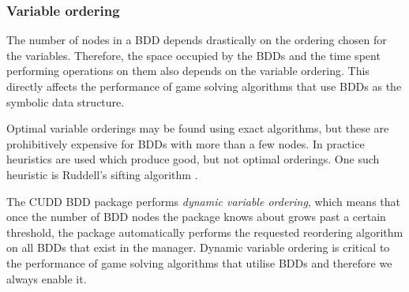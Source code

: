 \subsubsection{Variable ordering}

The number of nodes in a BDD depends drastically on the ordering chosen for the variables. Therefore, the space occupied by the BDDs and the time spent performing operations on them also depends on the variable ordering. This directly affects the performance of game solving algorithms that use BDDs as the symbolic data structure. 

Optimal variable orderings may be found using exact algorithms, but these are prohibitively expensive for BDDs with more than a few nodes. In practice heuristics are used which produce good, but not optimal orderings. One such heuristic is Ruddell's sifting algorithm \cite{sifting}.

The CUDD BDD package performs \emph{dynamic variable ordering}, which means that once the number of BDD nodes the package knows about grows past a certain threshold, the package automatically performs the requested reordering algorithm on all BDDs that exist in the manager. Dynamic variable ordering is critical to the performance of game solving algorithms that utilise BDDs and therefore we always enable it.

